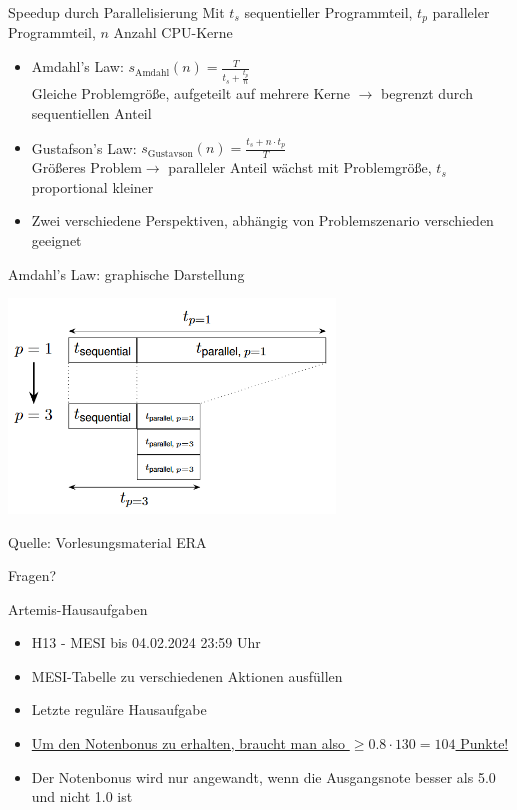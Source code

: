 \documentclass[
  german,            %
  aspectratio=169,    %
]{tumbeamer}
\begin{document}
\begin{frame}[c, fragile]{Speedup durch Parallelisierung}{}
  Mit $t_s$ sequentieller Programmteil, $t_p$ paralleler Programmteil, $n$ Anzahl CPU-Kerne
  \begin{itemize}
    \item Amdahl's Law: $s_{\textrm{Amdahl}}(n)=\frac{T}{t_s+\frac{t_p}{n}}$\\
          Gleiche Problemgröße, aufgeteilt auf mehrere Kerne $\rightarrow$ begrenzt durch sequentiellen Anteil
    \item Gustafson's Law: $s_{\textrm{Gustavson}}(n)=\frac{t_s+n\cdot t_p}{T}$\\
          Größeres Problem$\rightarrow$ paralleler Anteil wächst mit Problemgröße, $t_s$ proportional kleiner
    \item Zwei verschiedene Perspektiven, abhängig von Problemszenario verschieden geeignet
  \end{itemize}
\end{frame}

\begin{frame}[fragile, c]{Amdahl's Law: graphische Darstellung}{}
      \begin{center}
        \includegraphics[width=0.65\textwidth]{w13_amdahl.png}
      \end{center}
  \centering
  \tiny{Quelle: Vorlesungsmaterial ERA}
\end{frame}


\begin{frame}[c]{}{}
  \begin{center}
    \LARGE Fragen?
  \end{center}
\end{frame}

\begin{frame}[c, fragile]{Artemis-Hausaufgaben}{}
  \begin{itemize}
    \item H13 - MESI bis 04.02.2024 23:59 Uhr
    \item MESI-Tabelle zu verschiedenen Aktionen ausfüllen
    \item Letzte reguläre Hausaufgabe
    \item \underline{Um den Notenbonus zu erhalten, braucht man also $\ge 0.8\cdot 130 = 104$ Punkte!}
    \item Der Notenbonus wird nur angewandt, wenn die Ausgangsnote besser als 5.0 und nicht 1.0 ist
  \end{itemize}
\end{frame}
\end{document}
